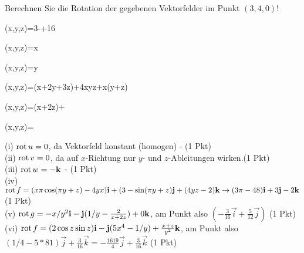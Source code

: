 \begin{atiTask}[
  title = Rotation berechnen
]
Berechnen Sie die Rotation der gegebenen Vektorfelder im Punkt $(3,4,0)$!
\begin{atiSubequations}
\item{(x,y,z)=3-\pi {}+16}
\item{(x,y,z)=x}
\item{(x,y,z)=y}
\item{(x,y,z)=(x+2y+3z)+4xyz+x\sin(\pi y+z)}
\item{(x,y,z)=\ln (x+2z)+}
\item{(x,y,z)=}
\end{atiSubequations}

\end{atiTask}
\begin{atiSolution}
(i) $\operatorname{rot} u=0$, da Vektorfeld konstant (homogen) - (1 Pkt) \\
(ii) $\operatorname{rot} v=0 $, da auf $x$-Richtung nur $y$- und $z$-Ableitungen wirken.(1 Pkt) \\
(iii) $\operatorname{rot} w=-\mathbf{k}$ - (1 Pkt)\\
(iv) $\operatorname{rot} f=(x\pi\cos (\pi y+z)-4yx)\mathbf{i}+(3-\sin(\pi y+z)\mathbf{j}+(4yz-2)\mathbf{k}\rightarrow (3\pi-48)\mathbf{i}+3\mathbf{j}-2\mathbf{k}$  (1 Pkt)\\
(v) $\operatorname{rot} g=-x/y^2\mathbf{i}-\mathbf{j}(1/y-\frac{2}{x+2z})+0\mathbf{k}$, am Punkt also $(-\frac{3}{16}\vec{i}+\frac{5}{12}\vec{j})$ (1 Pkt)\\
(vi) $\operatorname{rot} f=(2\cos z\sin z)\mathbf{i}-\mathbf{j}(5x^4-1/y)+\frac{x+z}{y^2}\mathbf{k}$, am Punkt also $(1/4-5*81)\vec{j}+\frac{3}{16}\vec{k}=-\frac{1619}{4}\vec{j}+\frac{3}{16}\vec{k}$ (1 Pkt)
\end{atiSolution}